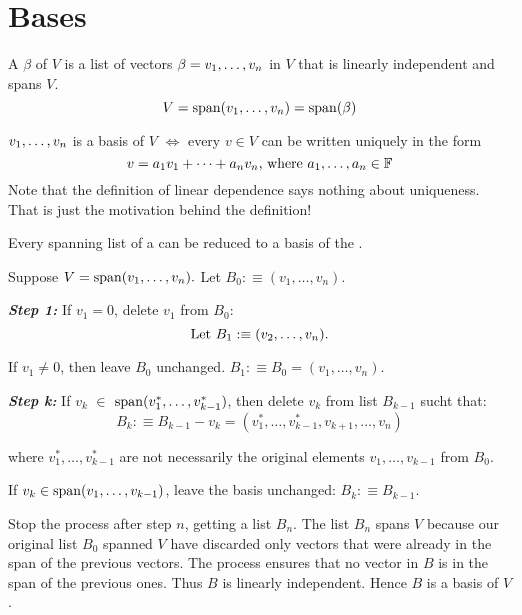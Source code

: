 \section{Bases}


\setcounter{thm}{25}
\begin{mydef} [Basis]
  A  $\beta$ of $V$ is a list of vectors $\beta = v_1, \dots, v_n$ in $V$ that is linearly independent and spans $V$.
  \begin{equation}
    V = \operatorname{span} (v_1, \dots, v_n) = \operatorname{span} ( \beta )
  \end{equation}
\end{mydef}

\setcounter{thm}{27}
\begin{thm} 
  $v_1, \dots, v_n$ is a basis of $V$ $\iff$ every $v \in V$ can be written uniquely in the form
  \begin{equation}
    v=a_1 v_1 + \dots + a_n v_n $, where $ a_1, \dots, a_n \in \myF
  \end{equation}
  Note that the definition of linear dependence says nothing about uniqueness. That is just the motivation behind the definition!
\end{thm}

\setcounter{thm}{29}
\begin{thm}  
  \label{thm: every spanning list contains a basis}
  Every spanning list of a \vs can be reduced to a basis of the \vs.
\end{thm}
\begin{prf}
  Suppose $V=\operatorname{span} (v_1, \ldots, v_n).$ Let $B_0 :\equiv (v_1, \ldots, v_n)$.
  
  \emph{\bfseries Step 1: } If $v_1 = 0$, delete $v_1$ from $B_0$: 
  \begin{equation}
    $Let $B_1 :\equiv (v_2, \ldots, v_n).
  \end{equation} 
  
  If $v_1 \neq 0$, then leave $B_0$ unchanged. $B_1 :\equiv B_0=(v_1, \ldots, v_n)$.
  
  \emph{\bfseries Step k: } If $v_k$ $\in$ $\operatorname{span} (v_1^*, \ldots, v_{k-1}^*)$, then delete $v_k$ from list $B_{k-1}$ sucht that:
  \begin{equation}
    B_k :\equiv B_{k-1} - v_k = (v_{1}^*, \ldots, v_{k-1}^*, v_{k+1}, \ldots, v_n)
  \end{equation} 
  
  where $v_1^*, \ldots, v_{k-1}^*$ are not necessarily the original elements $v_1, \ldots, v_{k-1}$ from $B_0$.
  
  If $v_k \in \operatorname{span} (v_1, \ldots, v_{k-1})$, leave the basis unchanged: $B_k :\equiv B_{k-1}$.
  
  Stop the process after step $n$, getting a list $B_n$. The list $B_n$ spans $V$ because our original list $B_0$ spanned $V$  have discarded only vectors that were already in the span of the previous vectors. The process ensures that no vector in $B$ is in the span of the previous ones. Thus $B$ is linearly independent. Hence $B$ is a basis of $V$.
\end{prf}

